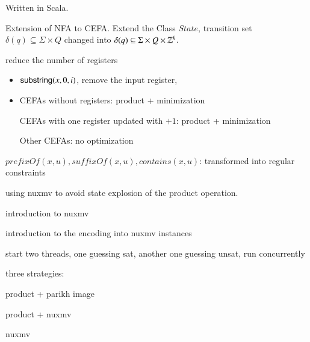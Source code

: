 

Written in Scala.

Extension of NFA to CEFA. Extend the Class $State$, transition set $\delta(q) \subseteq  \Sigma \times Q$ changed into  $\delta(q) \subseteq \Sigma \times Q \times \mathbb{Z}^k$. 

reduce the number of registers
\begin{itemize}
\item $\mathsf{substring}(x, 0, i)$, remove the input register,
%
\item CEFAs without registers: product + minimization 

CEFAs with one register updated with $+1$: product + minimization

Other CEFAs: no optimization
\end{itemize}

$prefixOf(x, u), suffixOf(x,u), contains(x, u)$: transformed into regular constraints

using nuxmv to avoid state explosion of the product operation.

introduction to nuxmv

introduction to the encoding into nuxmv instances

start two threads, one guessing sat, another one guessing unsat, run concurrently

three strategies: 

product + parikh image

product + nuxmv

nuxmv


